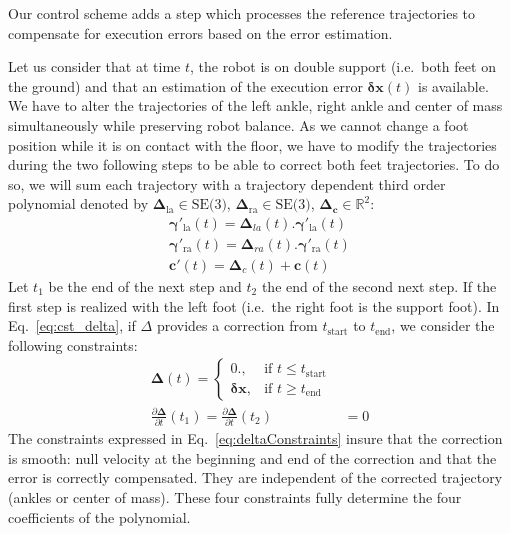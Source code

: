 Our control scheme adds a step which processes the reference
trajectories to compensate for execution errors based on the error
estimation.

Let us consider that at time $t$, the robot is on double support
(i.e.\ both feet on the ground) and that an estimation of the
execution error $\mathbf{\delta \mathbf{x}}(t)$ is available. We have
to alter the trajectories of the left ankle, right ankle and center of
mass simultaneously while preserving robot balance. As we cannot
change a foot position while it is on contact with the floor, we have
to modify the trajectories during the two following steps to be able
to correct both feet trajectories. To do so, we will sum each
trajectory with a trajectory dependent third order polynomial denoted
by $\mathbf{\Delta}_{\text{la}} \in \text{SE(3)}$,
$\mathbf{\Delta}_{\text{ra}} \in \text{SE(3)}$,
$\mathbf{\Delta}_{\mathbf{c}} \in \mathbb{R}^2$:
%
\begin{equation}
  \begin{aligned}
    \mathbf{\gamma}'_{\text{la}}(t) = \mathbf{\Delta}_{la}(t) . \mathbf{\gamma}'_{\text{la}}(t)\\
    \mathbf{\gamma}'_{\text{ra}}(t) = \mathbf{\Delta}_{ra}(t) . \mathbf{\gamma}'_{\text{ra}}(t)\\
    \mathbf{c}'(t) = \mathbf{\Delta}_{c}(t) + \mathbf{c}(t)
  \end{aligned}
  \label{eq:cst_delta}
\end{equation}
%
Let $t_1$ be the end of the next step and $t_2$ the end of the second
next step. If the first step is realized with the left foot (i.e.\ the
right foot is the support foot). In Eq.~\ref{eq:cst_delta}, if
$\Delta$ provides a correction from $t_{\text{start}}$ to
$t_{\text{end}}$, we consider the following constraints:
%
\begin{equation}
\begin{aligned}
  \mathbf{\Delta}(t) =
  \begin{cases}
    0.,  & \mbox{if }t\mbox{$\leq t_{\text{start}}$} \\
    \mathbf{\delta x}, & \mbox{if }t\mbox{$\geq t_{\text{end}}$}
  \end{cases}\\
  \frac{\partial \mathbf{\Delta}}{\partial t}(t_1) = \frac{\partial
    \mathbf{\Delta}}{\partial t}(t_2) &= 0
\end{aligned}
\label{eq:deltaConstraints}
\end{equation}
%
The constraints expressed in Eq.~\ref{eq:deltaConstraints} insure that
the correction is smooth: null velocity at the beginning and end of
the correction and that the error is correctly compensated. They are
independent of the corrected trajectory (ankles or center of
mass). These four constraints fully determine the four coefficients of
the polynomial.

